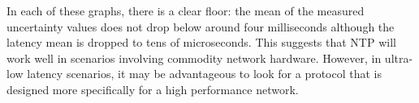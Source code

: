 In each of these graphs, there is a clear floor: the mean of the
measured uncertainty values does not drop below around four
milliseconds although the latency mean is dropped to tens of
microseconds. This suggests that NTP will work well in scenarios
involving commodity network hardware. However, in ultra-low latency
scenarios, it may be advantageous to look for a protocol that is
designed more specifically for a high performance network.











